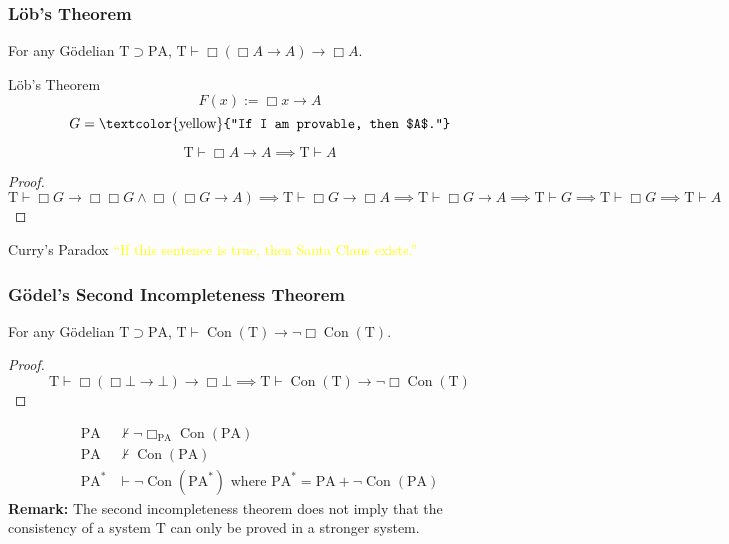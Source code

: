 \documentclass[UTF8,aspectratio=43,11pt,colorlinks,compress,openany]{beamer}%
\begin{document}
\begin{frame}\frametitle{L\"ob's Theorem}
\setlength\abovedisplayskip{0pt}
\setlength\belowdisplayskip{0pt}
	\begin{theorem}[L\"ob's Theorem]
		For any G\"odelian $\mathrm{T}\supset \mathrm{PA} $, $\mathrm{T}\vdash\Box (\Box A\to A)\to\Box A$.
	\end{theorem}
	\begin{block}{L\"ob's Theorem}
		\[F(x):=\Box x\to A\]
		\[G=\text{\textcolor{yellow}{``If I am provable, then $A$.''}}\]
	\end{block}
	\begin{corollary}
		\[\mathrm{T}\vdash\Box A\to A\implies \mathrm{T}\vdash A\]
	\end{corollary}\vspace{-1ex}
	\begin{proof}
	$\mathrm{T}\vdash\Box G\to \Box \Box G\wedge\Box (\Box G\to A)\implies\mathrm{T}\vdash\Box G\to\Box A\implies \mathrm{T}\vdash\Box G\to A\implies\mathrm{T}\vdash G\implies\mathrm{T}\vdash\Box G\implies\mathrm{T}\vdash A$
	\end{proof}\vspace{-1ex}
	\begin{block}{Curry's Paradox}
		\centering \textcolor{yellow}{``If this sentence is true, then Santa Claus exists.''}
	\end{block}
\end{frame}

\begin{frame}\frametitle{G\"odel's Second Incompleteness Theorem}
\setlength\abovedisplayskip{0pt}
\setlength\belowdisplayskip{0pt}
	\begin{theorem}
		For any G\"odelian $\mathrm{T}\supset \mathrm{PA} $, $\mathrm{T}\vdash\operatorname{Con}(\mathrm{T})\to\neg\Box \operatorname{Con}(\mathrm{T})$.
	\end{theorem}
	\begin{proof}
		\[\mathrm{T}\vdash\Box (\Box \bot\to\bot)\to\Box \bot\implies\mathrm{T}\vdash\operatorname{Con}(\mathrm{T})\to\neg\Box \operatorname{Con}(\mathrm{T})\]
	\end{proof}
	\begin{align*}
		\mathrm{PA}&\nvdash\neg\Box_{\mathrm{PA}}\operatorname{Con}(\mathrm{PA})\\
		\mathrm{PA}&\nvdash\operatorname{Con}(\mathrm{PA})\\
		\mathrm{PA}^*&\vdash\neg\operatorname{Con}(\mathrm{PA}^*) \mbox{ where } \mathrm{PA}^*=\mathrm{PA}+\neg\operatorname{Con}(\mathrm{PA})
	\end{align*}
	\textbf{Remark:} The second incompleteness theorem does not imply that the consistency of a system $\mathrm{T}$ can only be proved in a stronger system.
\end{frame}
\end{document}
